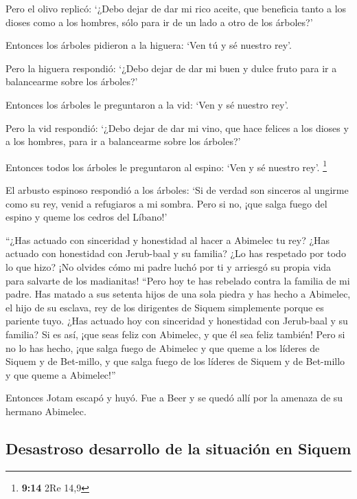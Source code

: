  Pero el olivo replicó: `¿Debo dejar de dar mi rico
aceite, que beneficia tanto a los dioses como a los hombres, sólo para
ir de un lado a otro de los árboles?'

 Entonces los árboles pidieron a la higuera: `Ven tú y sé
nuestro rey'.

 Pero la higuera respondió: `¿Debo dejar de dar mi buen y
dulce fruto para ir a balancearme sobre los árboles?'

 Entonces los árboles le preguntaron a la vid: `Ven y sé
nuestro rey'.

 Pero la vid respondió: `¿Debo dejar de dar mi vino, que
hace felices a los dioses y a los hombres, para ir a balancearme sobre
los árboles?'

 Entonces todos los árboles le preguntaron al espino:
`Ven y sé nuestro rey'. \footnote{\textbf{9:14} 2Re 14,9}

 El arbusto espinoso respondió a los árboles: `Si de
verdad son sinceros al ungirme como su rey, venid a refugiaros a mi
sombra. Pero si no, ¡que salga fuego del espino y queme los cedros del
Líbano!'

 ``¿Has actuado con sinceridad y honestidad al hacer a
Abimelec tu rey? ¿Has actuado con honestidad con Jerub-baal y su
familia? ¿Lo has respetado por todo lo que hizo?  ¡No
olvides cómo mi padre luchó por ti y arriesgó su propia vida para
salvarte de los madianitas!  ``Pero hoy te has rebelado
contra la familia de mi padre. Has matado a sus setenta hijos de una
sola piedra y has hecho a Abimelec, el hijo de su esclava, rey de los
dirigentes de Siquem simplemente porque es pariente tuyo.
 ¿Has actuado hoy con sinceridad y honestidad con
Jerub-baal y su familia? Si es así, ¡que seas feliz con Abimelec, y que
él sea feliz también!  Pero si no lo has hecho, ¡que
salga fuego de Abimelec y que queme a los líderes de Siquem y de
Bet-millo, y que salga fuego de los líderes de Siquem y de Bet-millo y
que queme a Abimelec!''

 Entonces Jotam escapó y huyó. Fue a Beer y se quedó allí
por la amenaza de su hermano Abimelec.

\hypertarget{desastroso-desarrollo-de-la-situaciuxf3n-en-siquem}{%
\subsection{Desastroso desarrollo de la situación en
Siquem}\label{desastroso-desarrollo-de-la-situaciuxf3n-en-siquem}}

